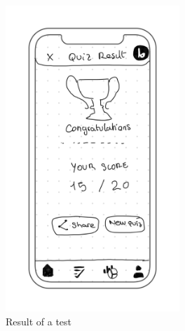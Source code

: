 \begin{figure}[H]
    \centering
    \begin{subfigure}[T]{0.32\textwidth}
        \centering
        \includegraphics[width=0.72\textwidth]{assets/screens/quiz/common/Quiz - Result.png}
        \caption{Result of a test}
        \label{fig:design_screen_result}
    \end{subfigure}
    \hfill
    \begin{subfigure}[T]{0.32\textwidth}
        \centering

\end{subfigure}
\end{figure}
